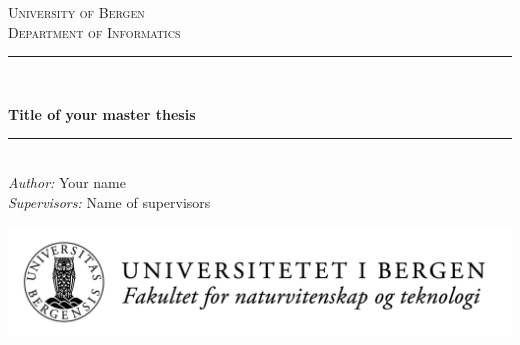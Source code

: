 \begin{titlepage}

\newcommand{\HRule}{\rule{\linewidth}{0.5mm}} %

\center %
 

\textsc{\LARGE University of Bergen \\ Department of Informatics}\\[1.5cm] %


\HRule \\[0.5cm]
\begin{Huge}
	\bfseries{Title of your master thesis}\\[0.7cm] %
\end{Huge}
\HRule \\[0.5cm]


\large \emph{Author:} Your name\\
\large \emph{Supervisors:} Name of supervisors\\[2cm]


\centerline{\includegraphics[scale=0.4]{figures/NT_PositivVenstrestilt_NOR}}


\end{titlepage}
